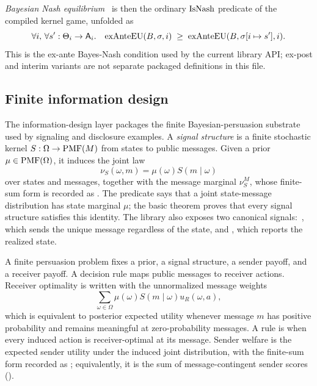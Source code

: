 \emph{Bayesian Nash equilibrium}~\citep{Harsanyi1967} is then the
ordinary $\mathrm{IsNash}$ predicate of the compiled kernel game,
unfolded as
\[
  \forall i,\, \forall s' : \Theta_i \to \mathsf{A}_i.\quad
    \mathrm{exAnteEU}(B, \sigma, i) \;\ge\;
    \mathrm{exAnteEU}(B, \sigma[i \mapsto s'], i).
\]
This is the ex-ante Bayes-Nash condition used by the current
library API; ex-post and interim variants are not separate packaged
definitions in this file.



\subsection{Finite information design}
\label{sec:mech:info-design}

The information-design layer packages the finite Bayesian-persuasion
substrate used by signaling and disclosure examples.  A
\emph{signal structure} is a finite stochastic kernel
$S : \Omega \to \mathrm{PMF}(M)$ from states to public messages.  Given a
prior $\mu \in \mathrm{PMF}(\Omega)$, it induces the joint law
\[
  \nu_S(\omega,m) = \mu(\omega) S(m \mid \omega)
\]
over states and messages, together with the message marginal
$\nu_S^M$, whose finite-sum form is recorded as
.  The predicate 
says that a joint state-message distribution has state marginal
$\mu$; the basic theorem  proves that
every signal structure satisfies this identity.  The library also
exposes two canonical signals:\ , which sends the
unique message regardless of the state, and ,
which reports the realized state.

A finite persuasion problem fixes a prior, a signal structure, a
sender payoff, and a receiver payoff.  A decision rule maps public
messages to receiver actions.  Receiver optimality is written with
the unnormalized message weights
\[
  \sum_{\omega \in \Omega}
    \mu(\omega) S(m \mid \omega) u_R(\omega,a),
\]
which is equivalent to posterior expected utility whenever message
$m$ has positive probability and remains meaningful at zero-probability
messages.  A rule is  when every induced action is
receiver-optimal at its message.  Sender welfare is the expected
sender utility under the induced joint distribution, with the
finite-sum form recorded as ; equivalently,
it is the sum of message-contingent sender scores
().

